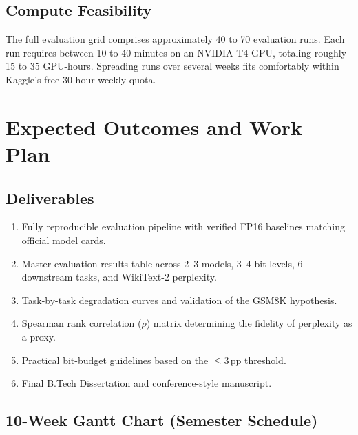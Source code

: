 \documentclass[12pt, a4paper]{article}
\begin{document}
\subsection{Compute Feasibility}
The full evaluation grid comprises approximately 40 to 70 evaluation runs. Each run requires between 10 to 40 minutes on an NVIDIA T4 GPU, totaling roughly 15 to 35 GPU-hours. Spreading runs over several weeks fits comfortably within Kaggle's free 30-hour weekly quota.

\section{Expected Outcomes and Work Plan}

\subsection{Deliverables}
\begin{enumerate}[leftmargin=*]
    \item Fully reproducible evaluation pipeline with verified FP16 baselines matching official model cards.
    \item Master evaluation results table across 2--3 models, 3--4 bit-levels, 6 downstream tasks, and WikiText-2 perplexity.
    \item Task-by-task degradation curves and validation of the GSM8K hypothesis.
    \item Spearman rank correlation ($\rho$) matrix determining the fidelity of perplexity as a proxy.
    \item Practical bit-budget guidelines based on the $\le 3\,\text{pp}$ threshold.
    \item Final B.Tech Dissertation and conference-style manuscript.
\end{enumerate}

\subsection{10-Week Gantt Chart (Semester Schedule)}
\end{document}
